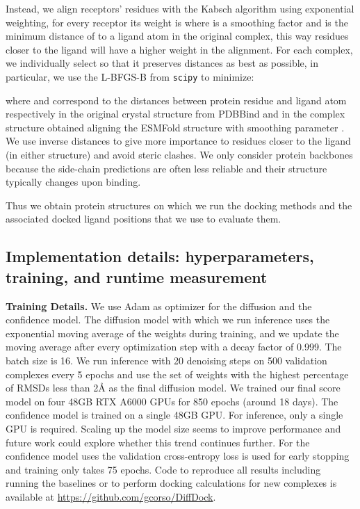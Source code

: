 \documentclass{article} \usepackage{iclr2023_conference,times}
\begin{document}
Instead, we align receptors' residues with the Kabsch algorithm using exponential weighting, for every receptor  its weight is  where  is a smoothing factor and  is the minimum distance of  to a ligand atom in the original complex, this way residues closer to the ligand will have a higher weight in the alignment. For each complex, we individually select  so that it preserves distances as best as possible, in particular, we use the L-BFGS-B \citep{byrd1995limited} from \texttt{scipy} \citep{virtanen2020scipy} to minimize:

where  and  correspond to the distances between protein residue  and ligand atom  respectively in the original crystal structure from PDBBind and in the complex structure obtained aligning the ESMFold structure with smoothing parameter . We use inverse distances to give more importance to residues closer to the ligand (in either structure) and avoid steric clashes. We only consider protein backbones because the side-chain predictions are often less reliable and their structure typically changes upon binding.

Thus we obtain protein structures on which we run the docking methods and the associated docked ligand positions that we use to evaluate them. 


\subsection{Implementation details: hyperparameters, training, and runtime measurement} \label{appx:hyperparameters}
\textbf{Training Details.} We use Adam \citep{kingma2014adam} as optimizer for the diffusion and the confidence model. The diffusion model with which we run inference uses the exponential moving average of the weights during training, and we update the moving average after every optimization step with a decay factor of 0.999. The batch size is 16. We run inference with 20 denoising steps on 500 validation complexes every 5 epochs and use the set of weights with the highest percentage of RMSDs less than 2\AA{} as the final diffusion model. We trained our final score model on four 48GB RTX A6000 GPUs for 850 epochs (around 18 days). The confidence model is trained on a single 48GB GPU. For inference, only a single GPU is required. Scaling up the model size seems to improve performance and future work could explore whether this trend continues further. For the confidence model uses the validation cross-entropy loss is used for early stopping and training only takes 75 epochs. Code to reproduce all results including running the baselines or to perform docking calculations for new complexes is available at \url{https://github.com/gcorso/DiffDock}.
\end{document}
